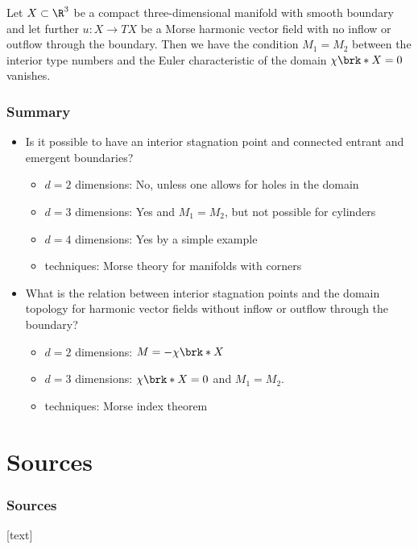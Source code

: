 \begin{frame}
  \begin{corollary}\label{co:n3_conditionTypeNbrII}
    Let $X\subset\R^3$ be a compact three-dimensional manifold with smooth boundary and let further
    $u\colon X\to TX$ be a Morse harmonic vector field with no
    inflow or outflow through the boundary. Then
    we have the condition $M_1=M_2$ between the interior type numbers and the Euler characteristic of the domain $\chi\brk*{X}=0$ vanishes.
  \end{corollary}
\end{frame}

\begin{frame}
  \frametitle{Summary}
  \begin{itemize}
    \item Is it possible to have an interior stagnation point and connected entrant and emergent boundaries?
      \begin{itemize}
        \item $d=2$ dimensions: No, unless one allows for holes in the domain
        \item $d=3$ dimensions: Yes and $M_1=M_2$, but not possible for cylinders
        \item $d=4$ dimensions: Yes by a simple example
        \item techniques: Morse theory for manifolds with corners
      \end{itemize}
    \item What is the relation between interior stagnation points and the domain topology for harmonic vector fields without inflow or outflow through the boundary?
      \begin{itemize}
        \item $d=2$ dimensions: $M=-\chi\brk*{X}$
        \item $d=3$ dimensions: $\chi\brk*{X}=0$ and $M_1=M_2$.
        \item techniques: Morse index theorem
      \end{itemize}
  \end{itemize}
\end{frame}


\section{Sources}

\begin{frame}[allowframebreaks]
	\frametitle{Sources}
	\nocite{*}

	[text]
	\printbibliography
\end{frame}


